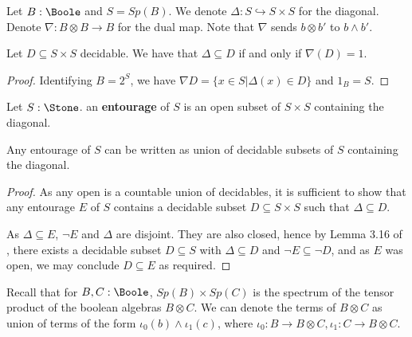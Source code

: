 \begin{definition}
  Let $B:\Boole$ and $S = Sp(B)$. We denote $\Delta : S \hookrightarrow S \times S$ for the diagonal.
  Denote $\nabla : B \otimes B \to B$ for the dual map. 
  Note that $\nabla$ sends $b \otimes b'$ to $b \wedge b'$.
\end{definition}
\begin{lemma}
  Let $D\subseteq S \times S$ decidable. We have that $\Delta \subseteq D$ if and only if $\nabla (D) = 1$. 
\end{lemma}
\begin{proof}
  Identifying $B = 2^S$, we have $\nabla D = \{x \in S | \Delta(x) \in D\}$ and $1_B = S$. 
\end{proof}

\begin{definition}
  Let $S:\Stone$. an \textbf{entourage} of $S$ is an open subset of $S \times S$ containing the diagonal. 
\end{definition}
\begin{lemma}
  Any entourage of $S$ can be written as union of decidable subsets of $S$ containing the diagonal. 
\end{lemma}
\begin{proof}
  As any open is a countable union of decidables, it is sufficient to show that any entourage $E$ of $S$ contains a decidable subset $D\subseteq S \times S$ such that $\Delta \subseteq D$. 

  As $\Delta \subseteq E$, $\neg E$ and $\Delta$ are disjoint. They are also closed, hence by Lemma 3.16 of \cite{synthetic-stone-duality}, there exists a decidable subset $D\subseteq S$ with $\Delta\subseteq D$ and $\neg E \subseteq \neg D$, and as $E$ was open, we may conclude $D\subseteq E$ as required. 
\end{proof}

\begin{remark}
  Recall that for $B,C:\Boole$, $Sp(B) \times Sp(C)$ is the spectrum of the tensor product of the boolean algebras $B \otimes C$. 
  We can denote the terms of $B \otimes C$ as union of terms of the form $\iota_0(b) \wedge \iota_1(c)$, where $\iota_0 : B \to B \otimes C, \iota_1 : C \to B \otimes C$. 
\end{remark}

